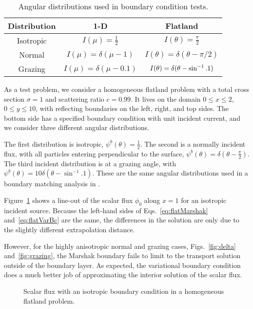 \begin{table}[htb]
  \centering
  \begin{tabular}{ccc}
\toprule
    Distribution & 1-D & Flatland
\\ \midrule
Isotropic & $I(\mu) = \frac{1}{2}$ & $I(\theta) = \frac{\pi}{2}$
\\
Normal & $I(\mu) = \delta(\mu-1)$ & $I(\theta) = \delta(\theta-\pi/2)$
\\
Grazing & $I(\mu) = \delta(\mu-0.1)$ & $I(\theta) = \delta(\theta-\sin^{-1}.1)$
\\ \bottomrule
  \end{tabular}
  \caption{Angular distributions used in boundary condition tests.}
  \label{tab:angularDistributions}
\end{table}

As a test problem, we consider a homogeneous flatland problem with a
total cross section $\sigma=1$ and scattering ratio $c=0.99$. It lives on the
domain $0 \le x \le 2$, $0 \le y \le 10$, with reflecting boundaries on the left,
right, and top sides. The bottom side has a specified boundary
condition with unit incident current, and we consider three different angular
distributions.

The first distribution is isotropic, $\psi^b(\theta) = \frac{1}{2}$. The second
is a normally incident flux, with all particles entering
perpendicular to the surface, $\psi^b(\theta) = \delta(\theta -
\frac{\pi}{2})$. The third incident distribution is at a grazing angle, with 
$\psi^b(\theta) = 10 \delta(\theta - \sin^{-1}.1)$.
These are the same angular distributions used in a boundary matching analysis
in \cite{Dav2006}.

Figure~\ref{fig:isotropic} shows a line-out of the scalar flux $\phi_0$ along
$x=1$ for an isotropic incident source. Because the left-hand sides of
Eqs.~\eqref{eq:flatMarshak} and~\eqref{eq:flatVarBc} are the same, the
differences in the solution are only due to the slightly different
extrapolation distance.

However, for the highly anisotropic normal and grazing cases,
Figs.~\ref{fig:delta} and~\ref{fig:grazing}, the Marshak boundary fails to
limit to the transport solution outside of the boundary layer. As
expected, the variational boundary condition does a much better job of
approximating the interior solution of the scalar flux.

\begin{figure}[htb!]
  \centering\small
  \hspace{-.5in}
  
  \hspace{-.5in}
  \caption{Scalar flux with an isotropic boundary condition in a homogeneous
  flatland problem.}
  \label{fig:isotropic}
\end{figure}


